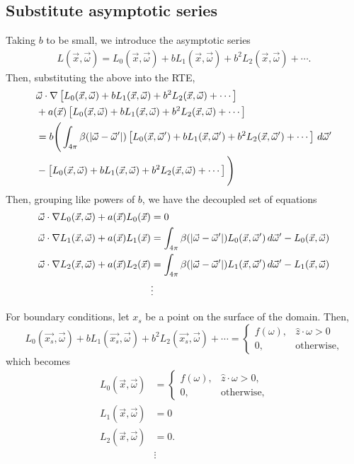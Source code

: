 \subsection{Substitute asymptotic series}
Taking $b$ to be small, we introduce the asymptotic series
\newcommand{\Lasym}{L_0(\vec{x},\vec{\omega}) + b L_1(\vec{x},\vec{\omega}) + b^2 L_2(\vec{x},\vec{\omega}) + \cdots}
\newcommand{\Lasyms}{L_0(\vec{x_s},\vec{\omega}) + b L_1(\vec{x_s},\vec{\omega}) + b^2 L_2(\vec{x_s},\vec{\omega}) + \cdots}
\newcommand{\Lasymp}{L_0(\vec{x},\vec{\omega}') + b L_1(\vec{x},\vec{\omega}') + b^2 L_2(\vec{x},\vec{\omega}') + \cdots}
\begin{align}
  L(\vec{x},\vec{\omega}) = \Lasym.
\end{align}
Then, substituting the above into the RTE,
\begin{equation}
  \begin{split}
    &\vec{\omega} \cdot \nabla \left[ \Lasym \right] \\
    &+ a(\vec{x}) \left[ \Lasym \right] \\
    &= b\Bigg(
      \int_{4\pi} \beta(\abs{\vec{\omega} - \vec{\omega}'})
      \left[ \Lasymp \right] \, d\vec{\omega}' \\
    &- \left[ \Lasym \right]
    \Bigg)
    \end{split}
\end{equation}
Then, grouping like powers of $b$, we have the decoupled set of equations
\begin{align}
  \vec{\omega} \cdot \nabla L_0(\vec{x}, \vec{\omega}) + a(\vec{x})L_0(\vec{x}) &= 0 \\
  \vec{\omega} \cdot \nabla L_1(\vec{x}, \vec{\omega}) + a(\vec{x})L_1(\vec{x})
  &= \int_{4\pi} \beta(\left| \vec{\omega} - \vec{\omega}' \right|) L_0(\vec{x}, \vec{\omega}')\,d\vec{\omega}' - L_0(\vec{x}, \vec{\omega}) \\ 
  \vec{\omega} \cdot \nabla L_2(\vec{x}, \vec{\omega}) + a(\vec{x})L_2(\vec{x})
  &= \int_{4\pi} \beta(\left| \vec{\omega} - \vec{\omega}' \right|) L_1(\vec{x}, \vec{\omega}')\,d\vec{\omega}' - L_1(\vec{x}, \vec{\omega}) \\ 
  &\vdots \nonumber
\end{align}

For boundary conditions, let $x_s$ be a point on the surface of the domain.
Then, 
\begin{equation}
  \Lasyms =
  \begin{cases}
    f(\omega), & \hat{z}\cdot\omega > 0 \\
    0, & \mbox{otherwise},
  \end{cases}
\end{equation}
which becomes
\begin{align}
  L_0(\vec{x}, \vec{\omega}) &=
  \begin{cases}
    f(\omega), & \hat{z}\cdot\omega > 0, \\
    0, & \mbox{otherwise},
  \end{cases} \\
  L_1(\vec{x}, \vec{\omega}) &= 0 \\
  L_2(\vec{x}, \vec{\omega}) &= 0. \\
  &\vdots \nonumber
\end{align}

